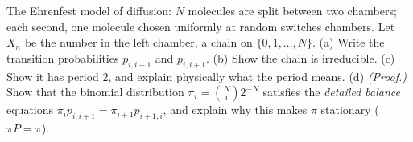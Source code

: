 \begin{exercise}
\label{ch23:ex-build}
The Ehrenfest model of diffusion: $N$ molecules are split between two chambers; each second,
one molecule chosen uniformly at random switches chambers. Let $X_n$ be the number in the
left chamber, a chain on $\{0, 1, \dots, N\}$. (a) Write the transition probabilities
$p_{i,i-1}$ and $p_{i,i+1}$. (b) Show the chain is irreducible. (c) Show it has period $2$, and
explain physically what the period means. (d) \emph{(Proof.)} Show that the binomial
distribution $\pi_i = \binom{N}{i} 2^{-N}$ satisfies the \emph{detailed balance} equations
$\pi_i p_{i,i+1} = \pi_{i+1} p_{i+1,i}$, and explain why this makes $\pi$ stationary
($\pi P = \pi$).
\end{exercise}
